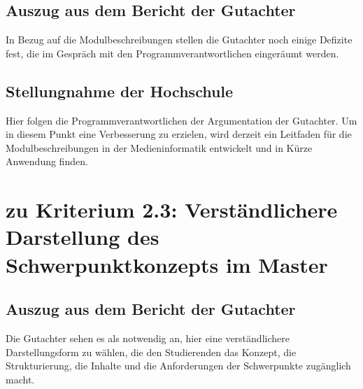 \subsection{Auszug aus dem Bericht der
Gutachter\label{/mi-2017/selbstbericht/stellungnahme/0000-stellungnahme}}\label{auszug-aus-dem-bericht-der-gutachterpathlabelmi-2017selbstberichtstellungnahme0000-stellungnahme-3}

\begin{siderules}
In Bezug auf die Modulbeschreibungen stellen die Gutachter noch einige
Defizite fest, die im Gespräch mit den Programmverantwortlichen
eingeräumt werden.
\end{siderules}

\subsection{Stellungnahme der
Hochschule\label{/mi-2017/selbstbericht/stellungnahme/0000-stellungnahme}}\label{stellungnahme-der-hochschulepathlabelmi-2017selbstberichtstellungnahme0000-stellungnahme-2}

Hier folgen die Programmverantwortlichen der Argumentation der
Gutachter. Um in diesem Punkt eine Verbesserung zu erzielen, wird
derzeit ein Leitfaden für die Modulbeschreibungen in der
Medieninformatik entwickelt und in Kürze Anwendung finden.

\section{zu Kriterium 2.3: Verständlichere Darstellung des
Schwerpunktkonzepts im
Master\label{/mi-2017/selbstbericht/stellungnahme/0000-stellungnahme}}\label{zu-kriterium-2.3-verstuxe4ndlichere-darstellung-des-schwerpunktkonzepts-im-masterpathlabelmi-2017selbstberichtstellungnahme0000-stellungnahme}

\subsection{Auszug aus dem Bericht der
Gutachter\label{/mi-2017/selbstbericht/stellungnahme/0000-stellungnahme}}\label{auszug-aus-dem-bericht-der-gutachterpathlabelmi-2017selbstberichtstellungnahme0000-stellungnahme-4}

\begin{siderules}
Die Gutachter sehen es als notwendig an, hier eine verständlichere
Darstellungsform zu wählen, die den Studierenden das Konzept, die
Strukturierung, die Inhalte und die Anforderungen der Schwerpunkte
zugänglich macht.
\end{siderules}

